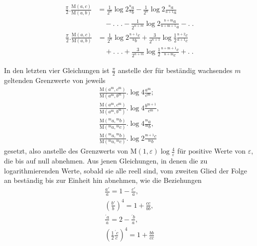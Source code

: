 \[
\begin{aligned}\displaystyle\frac\pi2.\frac{\mathrm{M}(a,c)}{\mathrm{M}(a,b)}&\displaystyle=\frac1{2^n}\log2\frac{{}^{\mathrm{n}}a}{{}^{\mathrm{n}}b}-\frac1{2^n}\log2\frac{{}^{\mathrm{n}}a}{{}^{\mathrm{n}+1}a}\\&\quad-.\;.\;.-\frac1{2^{n+m}}\log2\frac{{}^{\mathrm{n}+\mathrm{m}}a}{{}^{\mathrm{n}+\mathrm{m}+1}a}-.\;.\end{aligned}
\]
\[
\begin{aligned}\displaystyle\frac\pi2.\frac{\mathrm{M}(a,c)}{\mathrm{M}(a,b)}&\displaystyle=\frac1{2^n}\log2\frac{{}^{\mathrm{n}+1}c}{{}^{\mathrm{n}}b}+\frac3{2^{n+1}}\log\frac12\frac{{}^{\mathrm{n}+2}c}{{}^{\mathrm{n}+1}c}\\&\quad+.\;.\;.+\frac3{2^{n+m}}\log\frac12\frac{{}^{\mathrm{n}+\mathrm{m}+1}c}{{}^{\mathrm{n}+\mathrm{m}}c}+.\;.\end{aligned}
\]
\par In den letzten vier Gleichungen ist $\frac\pi2$ anstelle der für beständig wachsendes $m$ geltenden Grenzwerte von jeweils
\[
\begin{gathered}\frac{\mathrm{M}(a^{\mathrm{m}},c^{\mathrm{m}})}{\mathrm{M}(a^{\mathrm{m}},b^{\mathrm{m}})}.\log4\frac{a^{\mathrm{m}}}{c^{\mathrm{m}}};\\[9pt]
\frac{\mathrm{M}(a^{\mathrm{m}},c^{\mathrm{m}})}{\mathrm{M}(a^{\mathrm{m}},b^{\mathrm{m}})}.\log4\frac{b^{\mathrm{m}+1}}{c^{\mathrm{m}}},\\[9pt]
\frac{\mathrm{M}({}^{\mathrm{m}}a,{}^{\mathrm{m}}b)}{\mathrm{M}({}^{\mathrm{m}}a,{}^{\mathrm{m}}c)}.\log4\frac{{}^{\mathrm{m}}a}{{}^{\mathrm{m}}b},\\[9pt]
\frac{\mathrm{M}({}^{\mathrm{m}}a,{}^{\mathrm{m}}b)}{\mathrm{M}({}^{\mathrm{m}}a,{}^{\mathrm{m}}c)}.\log2\frac{{}^{\mathrm{m}+1}c}{{}^{\mathrm{m}}b}\end{gathered}
\]
gesetzt, also anstelle des Grenzwerts von $\mathrm{M}(1,\varepsilon)\log\frac4\varepsilon$ für positive Werte von $\varepsilon$, die bis auf null abnehmen. Aus jenen Gleichungen, in denen die zu logarithmierenden Werte, sobald sie alle reell sind, vom zweiten Glied der Folge an beständig bis zur Einheit hin abnehmen, wie die Beziehungen
\[
\begin{gathered}\frac{a'}a=1-\frac{c'}a,\\[7pt]
\left(\frac{b'}b\right)^4=1+\frac{cc}{bb},\\[7pt]
\frac{{}^\prime a}a=2-\frac{{}^\prime b}a,\\[7pt]
\left(\frac12\frac{{}^\prime c}c\right)^4=1+\frac{bb}{cc}\end{gathered}
\]
